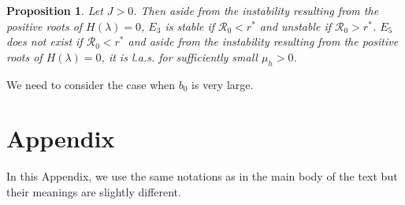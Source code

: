 \documentclass[12pt,leqno]{article}
\newtheorem{Proposition}[Theorem]{Proposition}%
\begin{document}
\begin{Proposition}\label{E3E5unstable}
Let $J > 0$. Then aside from the instability resulting from the positive roots of $H(\lambda)=0$, $E_3$ is stable if $\mathcal{R}_0 < r^*$ and unstable if $\mathcal{R}_0 > r^*$. $E_5$ does not exist if $\mathcal{R}_0 < r^*$ and aside from the instability resulting from the positive roots of $H(\lambda)=0$, it is l.a.s. for sufficiently small $\mu_h > 0$.
\end{Proposition}

{\color{red} We need to consider the case when $b_0$ is very large.}

\section{Appendix}\label{append}
In this Appendix, we use the same notations as in the main body of the text but their meanings are slightly different.\smallskip
\end{document}
